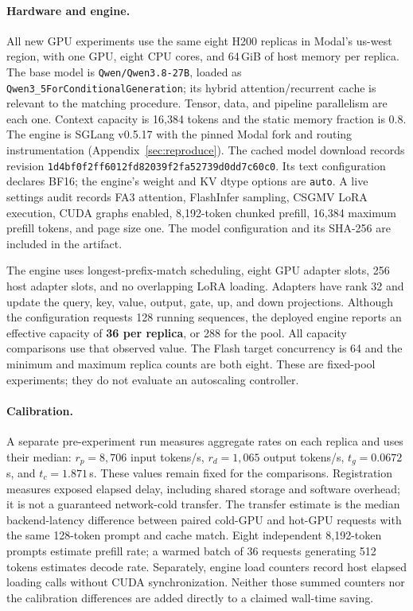 \paragraph{Hardware and engine.}
All new GPU experiments use the same eight H200 replicas in Modal's us-west
region, with one GPU, eight CPU cores, and 64\,GiB of host memory per replica.
The base model is \texttt{Qwen/Qwen3.8-27B}, loaded as
\texttt{Qwen3\_5ForConditionalGeneration}; its hybrid attention/recurrent cache
is relevant to the matching procedure. Tensor, data, and pipeline parallelism
are each one. Context capacity is 16,384 tokens and the static memory fraction
is 0.8. The engine is SGLang v0.5.17 with the pinned Modal fork and routing
instrumentation (Appendix~\ref{sec:reproduce}). The cached model download records
revision \texttt{1d4bf0f2ff6012fd82039f2fa52739d0dd7c60c0}.
Its text configuration declares BF16; the engine's weight and KV dtype options
are \texttt{auto}. A live settings audit records FA3 attention, FlashInfer
sampling, CSGMV LoRA execution, CUDA graphs enabled, 8,192-token chunked prefill,
16,384 maximum prefill tokens, and page size one. The model configuration and
its SHA-256 are included in the artifact.

The engine uses longest-prefix-match scheduling, eight GPU adapter slots,
256 host adapter slots, and no overlapping LoRA loading. Adapters have rank 32
and update the query, key, value, output, gate, up, and down projections.
Although the configuration requests 128 running sequences, the deployed engine
reports an effective capacity of \textbf{36 per replica}, or 288 for the pool.
All capacity comparisons use that observed value. The Flash target concurrency
is 64 and the minimum and maximum replica counts are both eight. These are
fixed-pool experiments; they do not evaluate an autoscaling controller.

\paragraph{Calibration.}
A separate pre-experiment run measures aggregate rates on each replica and uses
their median: $r_p=8{,}706$ input tokens/s, $r_d=1{,}065$ output tokens/s,
$t_g=0.0672$\,s, and $t_c=1.871$\,s. These values remain fixed for the
comparisons. Registration measures exposed elapsed delay, including shared
storage and software overhead; it is not a guaranteed network-cold transfer.
The transfer estimate is the median backend-latency difference between paired
cold-GPU and hot-GPU requests with the same 128-token prompt and cache match.
Eight independent 8,192-token prompts estimate prefill rate; a warmed batch of
36 requests generating 512 tokens estimates decode rate. Separately, engine
load counters record host elapsed loading calls without CUDA synchronization.
Neither those summed counters nor the calibration differences are added
directly to a claimed wall-time saving.


